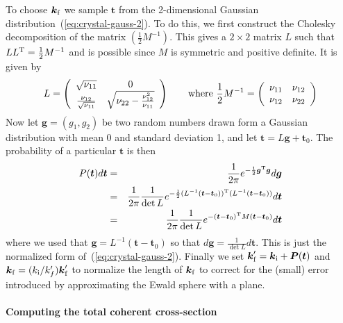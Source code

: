 To choose $\boldsymbol{k}_{\rm f}$ we sample $\boldsymbol{t}$ from the
2-dimensional Gaussian distribution~(\ref{eq:crystal-gauss-2}). To do
this, we first construct the Cholesky decomposition of the matrix
$(\frac{1}{2}M^{-1})$. This gives a $2\times 2$ matrix $L$ such that $L
L^{\rm T} = \frac{1}{2}M^{-1}$ and is possible since $M$ is symmetric
and positive definite. It is given by
$$
  L = \left(
  \begin{array}[c]{cc}
    \sqrt{\nu_{11}} & 0 \\
    \frac{\nu_{12}}{\sqrt{\nu_{11}}} & \sqrt{\nu_{22} - \frac{\nu_{12}^2}{\nu_{11}}}
  \end{array}\right)
\qquad\hbox{where }
  \frac{1}{2}M^{-1} = \left(
  \begin{array}[c]{cc}
    \nu_{11} & \nu_{12} \\
    \nu_{12} & \nu_{22}
  \end{array}\right)
$$
Now let $\boldsymbol{g} = (g_1, g_2)$ be two random numbers drawn form a
Gaussian distribution with mean 0 and standard deviation 1, and let
$\boldsymbol{t} = L\boldsymbol{g} + \boldsymbol{t}_0$. The probability
of a particular $\boldsymbol{t}$ is then
\begin{eqnarray}
  P(\boldsymbol{t})d\boldsymbol{t}
    &=& \frac{1}{2\pi}
      e^{-\frac{1}{2}\boldsymbol{g}^{\rm T}\boldsymbol{g}} d\boldsymbol{g} \\
    &=& \frac{1}{2\pi}\frac{1}{\det L}
      e^{-\frac{1}{2}(L^{-1}(\boldsymbol{t}-\boldsymbol{t}_0))^{\rm T}
          (L^{-1}(\boldsymbol{t}-\boldsymbol{t}_0))} d\boldsymbol{t} \\
    &=& \frac{1}{2\pi}\frac{1}{\det L}
      e^{-(\boldsymbol{t}-\boldsymbol{t}_0)^{\rm T}
          M(\boldsymbol{t}-\boldsymbol{t}_0)} d\boldsymbol{t}
  \label{eq:crystal-gauss-prob-1}
\end{eqnarray}
where we used that
$\boldsymbol{g}=L^{-1}(\boldsymbol{t}-\boldsymbol{t}_0)$ so that
$d\boldsymbol{g} = \frac{1}{\det L}d\boldsymbol{t}$. This is just the
normalized form of~(\ref{eq:crystal-gauss-2}). Finally we set
$\boldsymbol{k}'_{\rm f} = \boldsymbol{k}_{\rm i} +
\boldsymbol{P}(\boldsymbol{t})$ and
$\boldsymbol{k}_{\rm f} = (k_{\rm i}/k'_f)\boldsymbol{k}'_{\rm f}$ to
normalize the length of $\boldsymbol{k}_{\rm f}$ to correct for the
(small) error introduced by approximating the Ewald sphere with a plane.

\paragraph{Computing the total coherent cross-section}


